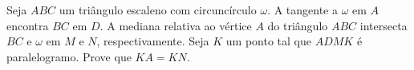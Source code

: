 Seja $ABC$ um triângulo escaleno com circuncírculo $\omega$. A tangente a $\omega$ em $A$ encontra $BC$ em $D$. A mediana relativa ao vértice $A$ do triângulo $ABC$ intersecta $BC$ e $\omega$ em $M$ e $N$, respectivamente. Seja $K$ um ponto tal que $ADMK$ é paralelogramo. Prove que $KA = KN$.
